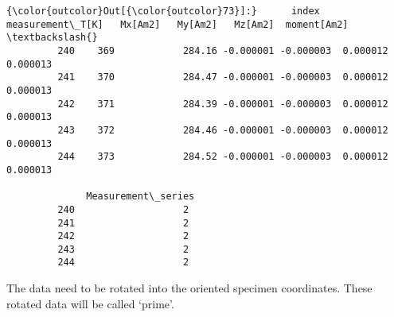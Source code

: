 \documentclass{article}
\begin{document}
            \begin{Verbatim}[commandchars=\\\{\}]
{\color{outcolor}Out[{\color{outcolor}73}]:}      index  measurement\_T[K]   Mx[Am2]   My[Am2]   Mz[Am2]  moment[Am2]  \textbackslash{}
         240    369            284.16 -0.000001 -0.000003  0.000012     0.000013   
         241    370            284.47 -0.000001 -0.000003  0.000012     0.000013   
         242    371            284.39 -0.000001 -0.000003  0.000012     0.000013   
         243    372            284.46 -0.000001 -0.000003  0.000012     0.000013   
         244    373            284.52 -0.000001 -0.000003  0.000012     0.000013   
         
              Measurement\_series  
         240                   2  
         241                   2  
         242                   2  
         243                   2  
         244                   2  
\end{Verbatim}
        
    The data need to be rotated into the oriented specimen coordinates.
These rotated data will be called `prime'.
\end{document}
